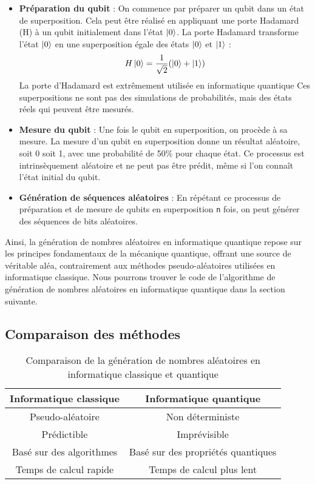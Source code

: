 \documentclass{article}
\begin{document}
\begin{itemize}
  \item \textbf{Préparation du qubit} : On commence par préparer un qubit dans un état de superposition. Cela peut être réalisé en appliquant une porte Hadamard (H) à un qubit initialement dans l'état $\ket{0}$. La porte Hadamard transforme l'état $\ket{0}$ en une superposition égale des états $\ket{0}$ et $\ket{1}$ :
  \[
  H\ket{0} = \frac{1}{\sqrt{2}}(\ket{0} + \ket{1})
  \]
  La porte d'Hadamard est extrêmement utilisée en informatique quantique Ces superpositions ne sont pas des simulations de probabilités, mais des états réels qui peuvent être mesurés.
  \item \textbf{Mesure du qubit} : Une fois le qubit en superposition, on procède à sa mesure. La mesure d'un qubit en superposition donne un résultat aléatoire, soit 0 soit 1, avec une probabilité de 50\% pour chaque état. Ce processus est intrinsèquement aléatoire et ne peut pas être prédit, même si l'on connaît l'état initial du qubit.
  \item \textbf{Génération de séquences aléatoires} : En répétant ce processus de préparation et de mesure de qubits en superposition \texttt{n} fois, on peut générer des séquences de bits aléatoires. 
\end{itemize}

Ainsi, la génération de nombres aléatoires en informatique quantique repose sur les principes
fondamentaux de la mécanique quantique, offrant une source de véritable aléa, contrairement
aux méthodes pseudo-aléatoires utilisées en informatique classique. Nous pourrons trouver le code
de l'algorithme de génération de nombres aléatoires en informatique quantique dans la section suivante.


\subsection{Comparaison des méthodes}

\begin{table}[h]
  \centering
  \begin{tabular}{|c|c|}
    \hline
    \textbf{Informatique classique} & \textbf{Informatique quantique} \\
    \hline
    Pseudo-aléatoire & Non déterministe \\
    \hline
    Prédictible & Imprévisible \\
    \hline
    Basé sur des algorithmes & Basé sur des propriétés quantiques \\
    \hline
    Temps de calcul rapide & Temps de calcul plus lent \\
    \hline
  \end{tabular}
  \caption{Comparaison de la génération de nombres aléatoires en informatique classique et quantique}
\end{table}
\end{document}
